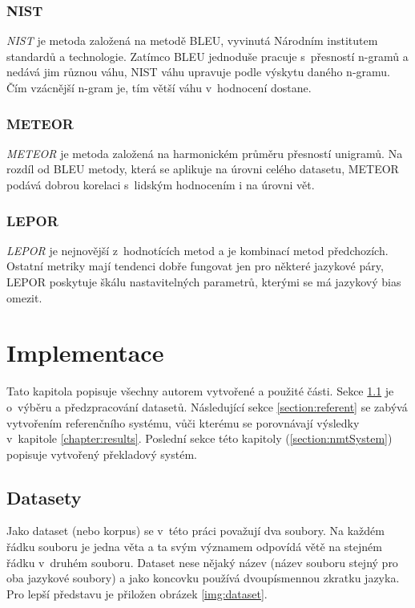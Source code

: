 \subsection{NIST}
\emph{NIST} \cite{NIST} je metoda založená na metodě BLEU, vyvinutá Národním institutem standardů a technologie. Zatímco BLEU jednoduše pracuje s~přesností n-gramů a nedává jim různou váhu, NIST váhu upravuje podle výskytu daného n-gramu. Čím vzácnější n-gram je, tím větší váhu v~hodnocení dostane.


\subsection{METEOR}
\emph{METEOR} \cite{METEOR} je metoda založená na harmonickém průměru přesností unigramů. Na rozdíl od BLEU metody, která se aplikuje na úrovni celého datasetu, METEOR podává dobrou korelaci s~lidským hodnocením i na úrovni vět.

\subsection{LEPOR}
\emph{LEPOR} \cite{LEPOR} je nejnovější z~hodnotících metod a je kombinací metod předchozích. Ostatní metriky mají tendenci dobře fungovat jen pro některé jazykové páry, LEPOR poskytuje škálu nastavitelných parametrů, kterými se má jazykový bias omezit.


\chapter{Implementace} \label{chapter:implementation}
Tato kapitola popisuje všechny autorem vytvořené a použité části. Sekce \ref{section:datasets} je o~výběru a předzpracování datasetů. Následující sekce \ref{section:referent} se zabývá vytvořením referenčního systému, vůči kterému se porovnávají výsledky v~kapitole \ref{chapter:results}. Poslední sekce této kapitoly (\ref{section:nmtSystem}) popisuje vytvořený překladový systém.

\section{Datasety}\label{section:datasets}
Jako dataset (nebo korpus) se v~této práci považují dva soubory. Na každém řádku souboru je jedna věta a ta svým významem odpovídá větě na stejném řádku v~druhém souboru. Dataset nese nějaký název (název souboru stejný pro oba jazykové soubory) a jako koncovku používá dvoupísmennou zkratku jazyka. Pro lepší představu je přiložen obrázek \ref{img:dataset}.

